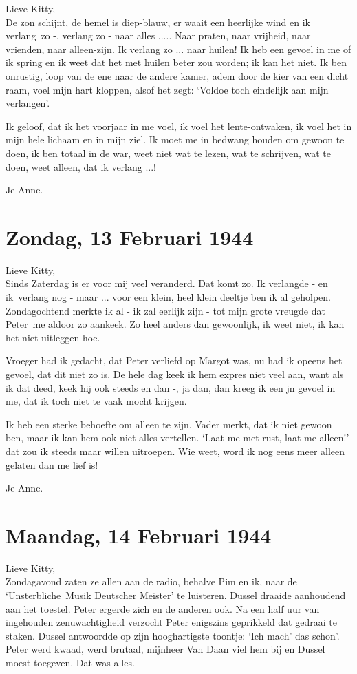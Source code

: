 \documentclass{book}
\begin{document}
Lieve Kitty,\\De zon schijnt, de hemel is diep-blauw, er waait een
heerlijke wind en ik verlang~zo -, verlang zo - naar alles ..... Naar
praten, naar vrijheid, naar vrienden, naar alleen-zijn. Ik verlang zo
... naar huilen! Ik heb een gevoel in me of ik spring en ik weet dat het
met huilen beter zou worden; ik kan het niet. Ik ben onrustig, loop van
de ene naar de andere kamer, adem door de kier van een dicht raam, voel
mijn hart kloppen, alsof het zegt: `Voldoe toch eindelijk aan mijn
verlangen'.

Ik geloof, dat ik het voorjaar in me voel, ik voel het lente-ontwaken,
ik voel het in mijn hele lichaam en in mijn ziel. Ik moet me in bedwang
houden om gewoon te doen, ik ben totaal in de war, weet niet wat te
lezen, wat te schrijven, wat te doen, weet alleen, dat ik verlang ...!

Je Anne.

\chapter{Zondag, 13 Februari 1944}

Lieve Kitty,\\Sinds Zaterdag is er voor mij veel veranderd. Dat komt zo.
Ik verlangde - en ik~verlang nog - maar ... voor een klein, heel klein
deeltje ben ik al geholpen. Zondagochtend merkte ik al - ik zal eerlijk
zijn - tot mijn grote vreugde dat Peter~me aldoor zo aankeek. Zo heel
anders dan gewoonlijk, ik weet niet, ik kan het niet uitleggen hoe.

Vroeger had ik gedacht, dat Peter verliefd op Margot was, nu had ik
opeens het gevoel, dat dit niet zo is. De hele dag keek ik hem expres
niet veel aan, want als ik dat deed, keek hij ook steeds en dan -, ja
dan, dan kreeg ik een jn gevoel in me, dat ik toch niet te vaak mocht
krijgen.

Ik heb een sterke behoefte om alleen te zijn. Vader merkt, dat ik niet
gewoon ben, maar ik kan hem ook niet alles vertellen. `Laat me met rust,
laat me alleen!' dat zou ik steeds maar willen uitroepen. Wie weet, word
ik nog eens meer alleen gelaten dan me lief is!

Je Anne.

\chapter{Maandag, 14 Februari 1944}

Lieve Kitty,\\Zondagavond zaten ze allen aan de radio, behalve Pim en
ik, naar de `Unsterbliche~Musik Deutscher Meister' te luisteren. Dussel
draaide aanhoudend aan het toestel. Peter ergerde zich en de anderen
ook. Na een half uur van ingehouden zenuwachtigheid verzocht Peter
enigszins geprikkeld dat gedraai te staken. Dussel antwoordde op zijn
hooghartigste toontje: `Ich mach' das schon'. Peter werd kwaad, werd
brutaal, mijnheer Van Daan viel hem bij en Dussel moest toegeven. Dat
was alles.
\end{document}
